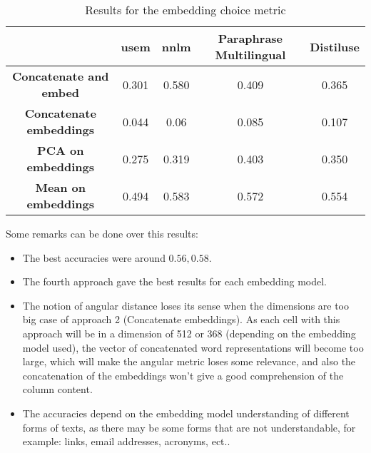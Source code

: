 \begin{table}[h]
    \begin{center}
        \begin{tabular}{|c | c | c | c| c|}
            \hline
                                            & \textbf{\acrshort{usem}}         &
            \textbf{\acrshort{nnlm}}        & \textbf{Paraphrase Multilingual} &
            \textbf{Distiluse}
            \\
            \hline

            \textbf{Concatenate and embed}  & 0.301                            & 0.580
                                            & 0.409                            & 0.365
            \\
            \hline

            \textbf{Concatenate embeddings} & 0.044                            & 0.06  &
            0.085                           & 0.107                                      \\
            \hline

            \textbf{PCA on embeddings}      & 0.275                            & 0.319
                                            & 0.403                            & 0.350
            \\
            \hline

            \textbf{Mean on embeddings}     & 0.494                            & 0.583
                                            & 0.572                            & 0.554
            \\
            \hline
        \end{tabular}
    \end{center}
    \caption{Results for the embedding choice metric}
    \label{table:embedding_metric_result}
\end{table}
Some remarks can be done over this results:
\begin{itemize}
    \item The best accuracies were around $0.56, 0.58$.
    \item The fourth approach gave the best results for each embedding model.
    \item The notion of angular distance loses its sense when the dimensions are
          too big case of approach 2 (Concatenate embeddings). As each cell with
          this approach will be in a dimension of 512 or 368 (depending on the
          embedding model used), the vector of concatenated word representations
          will become too large, which will make the angular metric loses some
          relevance, and also the concatenation of the embeddings won't give a
          good comprehension of the column content.
    \item The accuracies depend on the embedding model understanding of
          different forms of texts, as there may be some forms that are not
          understandable, for example: links, email addresses, acronyms, ect..

\end{itemize}


